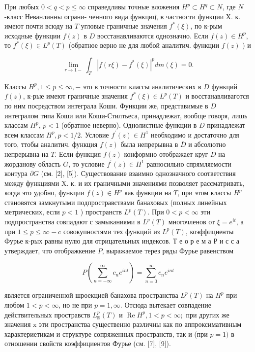 \documentclass[10pt]{article}
\begin{document}
При любых $0<q<p \leqslant \infty$ справедливы точные вложения $H^{p} \subset H^{q} \subset N$, где $N$-класс Неванлинны ограни- ченного вида функциц̈, в частности функции Х. к. имеют почти всюду на $T$ угловые граничные значения $f^{*}(\xi)$, по к-рым исходные функции $f(z)$ в $D$ восстанавливаются однозначно. Если $f(z) \in H^{p}$, то $f^{*}(\xi) \in L^{p}(T)$ (обратное верно не для любой аналитич. функции $f(z)$ ) и



\[

\lim _{r \rightarrow 1-} \int_{T}\left|f(r \xi)-f^{*}(\xi)\right|^{p} d m(\xi)=0 .

\]



Классы $H^{p}, 1 \leqslant p \leqslant \infty,-$ это в точности классы аналитических в $D$ функций $f(z)$, к-рые имеют граничные значения $f^{*}(\xi) \in L^{p}(T)$ и восстанавливаготся по ним посредством интеграла Коши. Функции же, представимые в $D$ интегралом типа Коши или Коши-Стилтьеса, принадлежат, вообще говоря, лишь классам $H^{p}$, $p<1$ (обратное неверно). Однолистные функции в $D$ принадлежат всем классам $H^{p}, p<1 / 2$. Условие $f^{\prime}(z) \in H^{1}$ необходимо и достаточно для того, ттобы аналитич. функция $f(z)$ была непрерывна в $\bar{D}$ и абсолютно непрерывна на $T$. Если функция $f(z)$ конформно отображает круг $D$ на жорданову область $G$, то условие $f^{\prime}(z) \in H^{1}$ равносильно спрямляемости контура $\partial G$ (см. [2], [5]). Существование взаимно однозначного соответствия между функциями X. к. и их граничными значениями позволяет рассматривать, когда это удобно, функции $f(z) \in H^{p}$ как функции на $T$, при этом классы $H^{p}$ становятся замкнутыми подпростравствами банаховых (полных линейных метрических, если $p<1$ ) пространств $L^{p}(T)$. При $0<p<\infty$ эти подпространства совпадают с замыканиями в $L^{p}(T)$ многочленов от $\xi=e^{i t}$, а при $1 \leqslant p \leqslant \infty-\mathrm{c}$ совокупностями тех функций из $L^{p}(T)$, коэффициенты Фурье к-рых равны нулю для отрицательных индексов. Т е о р е м а Р и с с а утверждает, что отображкение $P$, выражаемое терез ряды Фурье равенством



\[

P\left(\sum_{n=-\infty}^{\infty} c_{n} e^{i n t}\right)=\sum_{n=0}^{\infty} c_{n} e^{i n t}

\]



является ограниченной шроекцией банахова пространства $L^{p}(T)$ на $H^{p}$ при любом $1<p<\infty$, но не при $p=1, \infty$. Отсюда вытекает совпадение действительных простравств $L_{\mathbb{R}}^{p}(T)$ и $\operatorname{Re} H^{p}, 1<p<\infty ;$ при других же значения $\mathrm{x}$ эти пространства существенно различны как по аппроксимативным характериетикам и структуре сопряженных пространств, так и (при $p=1)$ в отношении свойств коэффициентов Фурье (см. [7], [9]).
\end{document}
